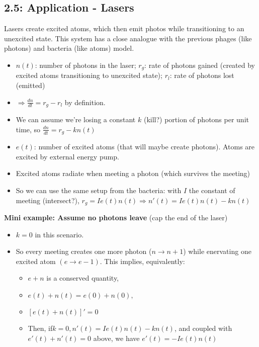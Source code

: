 \documentclass[11pt, oneside]{article}   	%
\begin{document}
\subsection{2.5: Application - Lasers}

Lasers create excited atoms, which then emit photos while transitioning to an unexcited state.  This system has a close analogue with the previous phages (like photons) and bacteria (like atoms) model.

\begin{itemize}
\item $n(t)$: number of photons in the laser; $r_g$: rate of photons gained (created by excited atoms transitioning to unexcited state); $r_l$: rate of photons lost (emitted)
\item $\Rightarrow \frac{dn}{dt} = r_g - r_l$ by definition.
\item We can assume we're losing a constant $k$ (kill?) portion of photons per unit time, so $ \frac{dn}{dt} = r_g - kn(t)$
\item $e(t)$: number of excited atoms (that will maybe create photons).  Atoms are excited by external energy pump.
\item Excited atoms radiate when meeting a photon (which survives the meeting)
\item So we can use the same setup from the bacteria: with $I$ the constant of meeting (intersect?), $r_g = Ie(t)n(t) \Rightarrow n'(t) = Ie(t)n(t) - kn(t)$
\end{itemize}

\textbf{Mini example: Assume no photons leave} (cap the end of the laser)

\begin{itemize}
\item $k = 0$ in this scenario.
\item So every meeting creates one more photon ($n \rightarrow n + 1$) while enervating one excited atom $(e \rightarrow e - 1)$.  This implies, equivalently:
\begin{itemize}
\item $e+n$ is a conserved quantity,
\item $e(t) + n(t) = e(0) + n(0),$
\item $[e(t) + n(t)]' = 0$
\item Then, if$ k=0,  n'(t) = Ie(t)n(t) - kn(t)$, and coupled with $e'(t) + n'(t) = 0$ above, we have $e'(t) = -Ie(t)n(t)$
\end{itemize}
\end{itemize}
\end{document}
